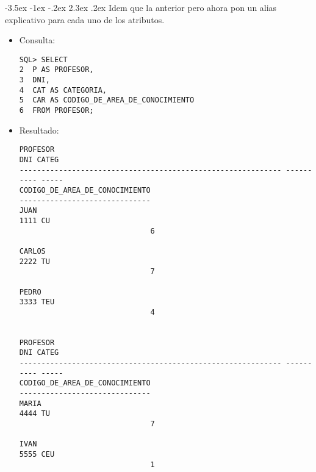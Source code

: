 \documentclass[11pt]{report}
\makeatletter
\renewcommand\chapter{\@startsection{chapter}{0}{\z@}%
    {-3.5ex \@plus -1ex \@minus -.2ex}%
    {2.3ex \@plus.2ex}%
    {\normalfont\Large\bfseries}}
\makeatother
\begin{document}
\chapter{Idem que la anterior pero ahora pon un alias explicativo para cada uno de los atributos.}
\begin{itemize}
  \item Consulta:
  \begin{verbatim}
SQL> SELECT
2  P AS PROFESOR,
3  DNI,
4  CAT AS CATEGORIA,
5  CAR AS CODIGO_DE_AREA_DE_CONOCIMIENTO
6  FROM PROFESOR;
  \end{verbatim}
  \item{Resultado:}
  \begin{verbatim}
PROFESOR                                                            DNI CATEG   
------------------------------------------------------------ ---------- -----   
CODIGO_DE_AREA_DE_CONOCIMIENTO                                                  
------------------------------                                                  
JUAN                                                               1111 CU      
                              6                                                  
                                                                                
CARLOS                                                             2222 TU      
                              7                                                  
                                                                                
PEDRO                                                              3333 TEU     
                              4                                                  
                                                                                

PROFESOR                                                            DNI CATEG   
------------------------------------------------------------ ---------- -----   
CODIGO_DE_AREA_DE_CONOCIMIENTO                                                  
------------------------------                                                  
MARIA                                                              4444 TU      
                              7                                                  
                                                                                
IVAN                                                               5555 CEU     
                              1                                                  
                                                                                

\end{verbatim}
\end{itemize}
\end{document}

